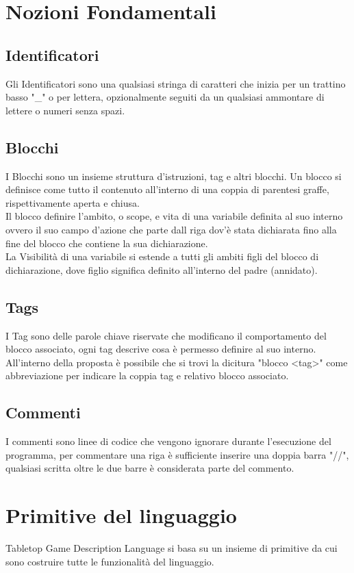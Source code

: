 \section{Nozioni Fondamentali}

\subsection{Identificatori}
Gli Identificatori sono una qualsiasi stringa di caratteri che inizia per un trattino basso "\_" o 
per lettera, opzionalmente seguiti da un qualsiasi ammontare di lettere o numeri senza spazi.

\subsection{Blocchi}
I Blocchi sono un insieme struttura d'istruzioni, tag e altri blocchi.
Un blocco si definisce come tutto il contenuto all'interno di una coppia di parentesi graffe,
rispettivamente aperta e chiusa. 
\\
Il blocco definire l'ambito, o scope, e vita di una variabile definita al suo interno ovvero
il suo campo d'azione che parte dall riga dov'è stata dichiarata fino alla fine del blocco 
che contiene la sua dichiarazione.
\\
La Visibilità di una variabile si estende a tutti gli ambiti figli del blocco di dichiarazione, 
dove figlio significa definito all'interno del padre (annidato).

 
\subsection{Tags}
I Tag sono delle parole chiave riservate che modificano il comportamento del blocco associato, 
ogni tag descrive cosa è permesso definire al suo interno.
All'interno della proposta è possibile che si trovi la dicitura "blocco <tag>" come abbreviazione
per indicare la coppia tag e relativo blocco associato.

 
\subsection{Commenti}
I commenti sono linee di codice che vengono ignorare durante l'esecuzione del programma, 
per commentare una riga è sufficiente inserire una doppia barra "//", qualsiasi scritta oltre 
le due barre è considerata parte del commento.

\section{Primitive del linguaggio}
Tabletop Game Description Language si basa su un insieme di primitive da cui sono costruire tutte 
le funzionalità del linguaggio.

